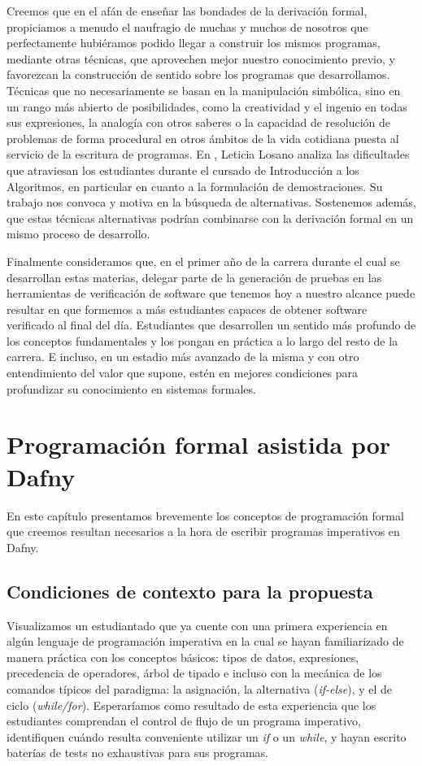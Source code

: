 \documentclass[12pt, a4paper, openany, fleqn]{book}
\begin{document}
    Creemos que en el afán de enseñar las bondades de la derivación formal, propiciamos a menudo el naufragio de muchas y muchos de nosotros que perfectamente hubiéramos podido llegar a construir los mismos programas, mediante otras técnicas, que aprovechen mejor nuestro conocimiento previo, y favorezcan la construcción de sentido sobre los programas que desarrollamos. Técnicas que no necesariamente se basan en la manipulación simbólica, sino en un rango más abierto de posibilidades, como la creatividad y el ingenio en todas sus expresiones, la analogía con otros saberes o la capacidad de resolución de problemas de forma procedural en otros ámbitos de la vida cotidiana puesta al servicio de la escritura de programas. En \cite{Losano}, Leticia Losano analiza las dificultades que atraviesan los estudiantes durante el cursado de Introducción a los Algoritmos, en particular en cuanto a la formulación de demostraciones. Su trabajo nos convoca y motiva en la búsqueda de alternativas. Sostenemos además, que estas técnicas alternativas podrían combinarse con la derivación formal en un mismo proceso de desarrollo.

    Finalmente consideramos que, en el primer año de la carrera durante el cual se desarrollan estas materias, delegar parte de la generación de pruebas en las herramientas de verificación de software que tenemos hoy a nuestro alcance puede resultar en que formemos a más estudiantes capaces de obtener software verificado al final del día. Estudiantes que desarrollen un sentido más profundo de los conceptos fundamentales y los pongan en práctica a lo largo del resto de la carrera. E incluso, en un estadio más avanzado de la misma y con otro entendimiento del valor que supone, estén en mejores condiciones para profundizar su conocimiento en sistemas formales.

    \chapter{Programación formal asistida por Dafny}

    En este capítulo presentamos brevemente los conceptos de programación formal que creemos resultan necesarios a la hora de escribir programas imperativos en Dafny.

    \section{Condiciones de contexto para la propuesta}
    Visualizamos un estudiantado que ya cuente con una primera experiencia en algún lenguaje de programación imperativa en la cual se hayan familiarizado de manera práctica con los conceptos básicos: tipos de datos, expresiones, precedencia de operadores, árbol de tipado e incluso con la mecánica de los comandos típicos del paradigma: la asignación, la alternativa (\textit{if-else}), y el de ciclo (\textit{while/for}). Esperaríamos como resultado de esta experiencia que los estudiantes comprendan el control de flujo de un programa imperativo, identifiquen cuándo resulta conveniente utilizar un \textit{if} o un \textit{while}, y hayan escrito baterías de tests no exhaustivas para sus programas.
\end{document}
